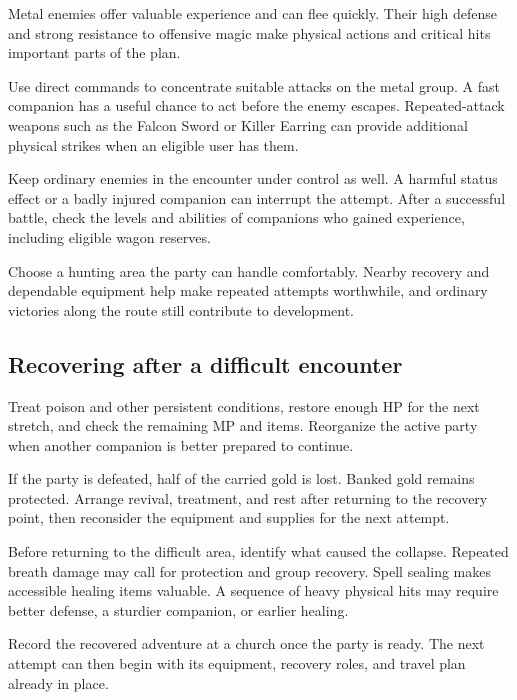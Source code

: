 Metal enemies offer valuable experience and can flee quickly. Their high
defense and strong resistance to offensive magic make physical actions
and critical hits important parts of the plan.

Use direct commands to concentrate suitable attacks on the metal group.
A fast companion has a useful chance to act before the enemy escapes.
Repeated-attack weapons such as the Falcon Sword or Killer Earring can
provide additional physical strikes when an eligible user has them.

Keep ordinary enemies in the encounter under control as well. A harmful
status effect or a badly injured companion can interrupt the attempt.
After a successful battle, check the levels and abilities of companions
who gained experience, including eligible wagon reserves.

Choose a hunting area the party can handle comfortably. Nearby recovery
and dependable equipment help make repeated attempts worthwhile, and
ordinary victories along the route still contribute to development.

\subsection*{Recovering after a difficult encounter}

Treat poison and other persistent conditions, restore enough HP for the
next stretch, and check the remaining MP and items. Reorganize the active
party when another companion is better prepared to continue.

If the party is defeated, half of the carried gold is lost. Banked gold
remains protected. Arrange revival, treatment, and rest after returning
to the recovery point, then reconsider the equipment and supplies for
the next attempt.

Before returning to the difficult area, identify what caused the collapse.
Repeated breath damage may call for protection and group recovery.
Spell sealing makes accessible healing items valuable. A sequence of
heavy physical hits may require better defense, a sturdier companion,
or earlier healing.

Record the recovered adventure at a church once the party is ready.
The next attempt can then begin with its equipment, recovery roles,
and travel plan already in place.

